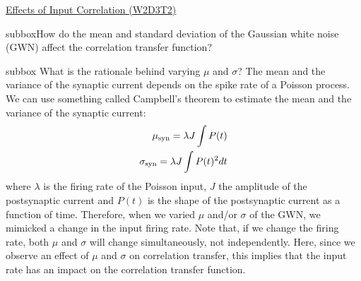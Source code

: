 \begin{textbox}{\href{https://compneuro.neuromatch.io/tutorials/W1D4_GeneralizedLinearModels/student/W1D4_Tutorial1.html}{Effects of Input Correlation (W2D3T2)} }
\begin{subbox}{subbox}{How do the mean and standard deviation of the Gaussian white noise (GWN) affect the correlation transfer function?}
\end{subbox}
\begin{subbox}{subbox}{
What is the rationale behind varying $\mu$ and $\sigma$?}
\scriptsize
The mean and the variance of the synaptic current depends on the spike rate of a Poisson process. We can use something called Campbell's theorem to estimate the mean and the variance of the synaptic current:
\begin{align}
\mu_{\rm syn} = \lambda J \int P(t) \\
\sigma_{\rm syn} = \lambda J \int P(t)^2 dt
\end{align}
where $\lambda$ is the firing rate of the Poisson input, $J$ the amplitude of the postsynaptic current and $P(t)$ is the shape of the postsynaptic current as a function of time. 
Therefore, when we varied $\mu$ and/or $\sigma$ of the GWN, we mimicked a change in the input firing rate. Note that, if we change the firing rate, both $\mu$ and $\sigma$ will change simultaneously, not independently. 
Here, since we observe an effect of $\mu$ and $\sigma$ on correlation transfer, this implies that the input rate has an impact on the correlation transfer function.

\end{subbox}
\end{textbox}

